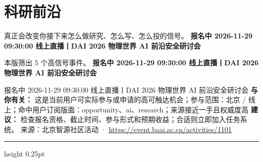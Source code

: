 \documentclass[10.5pt]{ctexart}
\begin{document}
\section*{科研前沿}
{\color{ormuted} 真正会改变你接下来怎么做研究、怎么写、怎么投的信号。}
\vspace{2mm}
{\LARGE\bfseries 报名中 2026-11-29 09:30:00 线上直播丨DAI 2026 物理世界 AI 前沿安全研讨会}\par
\vspace{1mm}
{\color{ormuted} 本版筛出 5 个高信号事件。}
\vspace{3mm}
{\Large\bfseries 报名中 2026-11-29 09:30:00 线上直播丨DAI 2026 物理世界 AI 前沿安全研讨会}\par
报名中 2026-11-29 09:30:00 线上直播丨DAI 2026 物理世界 AI 前沿安全研讨会
\textbf{与你有关：} 这是当前用户可实际参与或申请的高可触达机会；参与范围：北京 / 线上；命中用户订阅版面：opportunity、ai、research；来源接近一手且权威度高
\textbf{建议：} 检查报名资格、截止时间、参与形式和预期收益；合适则立即加入任务系统。
{\footnotesize\color{ormuted} 来源：北京智源社区活动 · \url{https://event.baai.ac.cn/activities/1101}}
\vspace{4mm}
\hrule height 0.25pt
\vspace{3mm}
\end{document}
